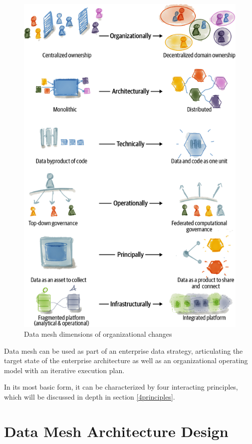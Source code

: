 \documentclass[12pt, a4paper]{book}
\begin{document}
\begin{figure}[h]
	\centering
	\includegraphics[width=14cm]{OrgChanges.png}
	\caption{Data mesh dimensions of organizational changes}
	\label{orgchange}
\end{figure}

Data mesh can be used as part of an enterprise data strategy, articulating the target state of the enterprise architecture as well as an organizational operating model with an iterative execution plan.

In its most basic form, it can be characterized by four interacting principles, which will be discussed in depth in section \ref{4principles}.

\chapter{Data Mesh Architecture Design}
\end{document}

